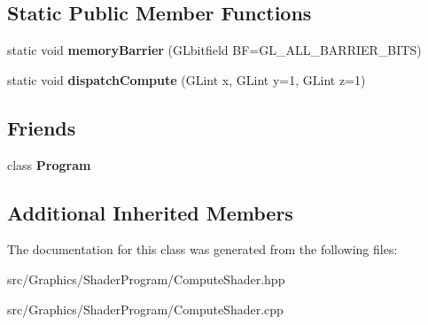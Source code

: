 \subsection*{Static Public Member Functions}
\begin{DoxyCompactItemize}
\item 
\hypertarget{class_compute_shader_a01fe703554fc9844e5f16c8860c2e44b}{static void {\bfseries memory\+Barrier} (G\+Lbitfield B\+F=G\+L\+\_\+\+A\+L\+L\+\_\+\+B\+A\+R\+R\+I\+E\+R\+\_\+\+B\+I\+T\+S)}\label{class_compute_shader_a01fe703554fc9844e5f16c8860c2e44b}

\item 
\hypertarget{class_compute_shader_ade055daefa7afb6c0ef8ec7ff27828ff}{static void {\bfseries dispatch\+Compute} (G\+Lint x, G\+Lint y=1, G\+Lint z=1)}\label{class_compute_shader_ade055daefa7afb6c0ef8ec7ff27828ff}

\end{DoxyCompactItemize}
\subsection*{Friends}
\begin{DoxyCompactItemize}
\item 
\hypertarget{class_compute_shader_a0432bf4ab621f4098afac914ccb5371e}{class {\bfseries Program}}\label{class_compute_shader_a0432bf4ab621f4098afac914ccb5371e}

\end{DoxyCompactItemize}
\subsection*{Additional Inherited Members}


The documentation for this class was generated from the following files\+:\begin{DoxyCompactItemize}
\item 
src/\+Graphics/\+Shader\+Program/Compute\+Shader.\+hpp\item 
src/\+Graphics/\+Shader\+Program/Compute\+Shader.\+cpp\end{DoxyCompactItemize}
